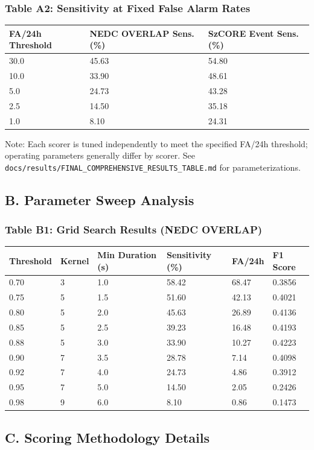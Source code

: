 \documentclass[
]{article}
\begin{document}
\hypertarget{table-a2-sensitivity-at-fixed-false-alarm-rates}{%
\subsubsection{Table A2: Sensitivity at Fixed False Alarm
Rates}\label{table-a2-sensitivity-at-fixed-false-alarm-rates}}

\begin{longtable}[]{@{}lll@{}}
\toprule
FA/24h Threshold & NEDC OVERLAP Sens. (\%) & SzCORE Event Sens.
(\%)\tabularnewline
\midrule
\endhead
30.0 & 45.63 & 54.80\tabularnewline
10.0 & 33.90 & 48.61\tabularnewline
5.0 & 24.73 & 43.28\tabularnewline
2.5 & 14.50 & 35.18\tabularnewline
1.0 & 8.10 & 24.31\tabularnewline
\bottomrule
\end{longtable}

Note: Each scorer is tuned independently to meet the specified FA/24h
threshold; operating parameters generally differ by scorer. See
\texttt{docs/results/FINAL\_COMPREHENSIVE\_RESULTS\_TABLE.md} for
parameterizations.

\hypertarget{b.-parameter-sweep-analysis}{%
\subsection{B. Parameter Sweep
Analysis}\label{b.-parameter-sweep-analysis}}

\hypertarget{table-b1-grid-search-results-nedc-overlap}{%
\subsubsection{Table B1: Grid Search Results (NEDC
OVERLAP)}\label{table-b1-grid-search-results-nedc-overlap}}

\begin{longtable}[]{@{}llllll@{}}
\toprule
Threshold & Kernel & Min Duration (s) & Sensitivity (\%) & FA/24h & F1
Score\tabularnewline
\midrule
\endhead
0.70 & 3 & 1.0 & 58.42 & 68.47 & 0.3856\tabularnewline
0.75 & 5 & 1.5 & 51.60 & 42.13 & 0.4021\tabularnewline
0.80 & 5 & 2.0 & 45.63 & 26.89 & 0.4136\tabularnewline
0.85 & 5 & 2.5 & 39.23 & 16.48 & 0.4193\tabularnewline
0.88 & 5 & 3.0 & 33.90 & 10.27 & 0.4223\tabularnewline
0.90 & 7 & 3.5 & 28.78 & 7.14 & 0.4098\tabularnewline
0.92 & 7 & 4.0 & 24.73 & 4.86 & 0.3912\tabularnewline
0.95 & 7 & 5.0 & 14.50 & 2.05 & 0.2426\tabularnewline
0.98 & 9 & 6.0 & 8.10 & 0.86 & 0.1473\tabularnewline
\bottomrule
\end{longtable}

\hypertarget{c.-scoring-methodology-details}{%
\subsection{C. Scoring Methodology
Details}\label{c.-scoring-methodology-details}}
\end{document}
